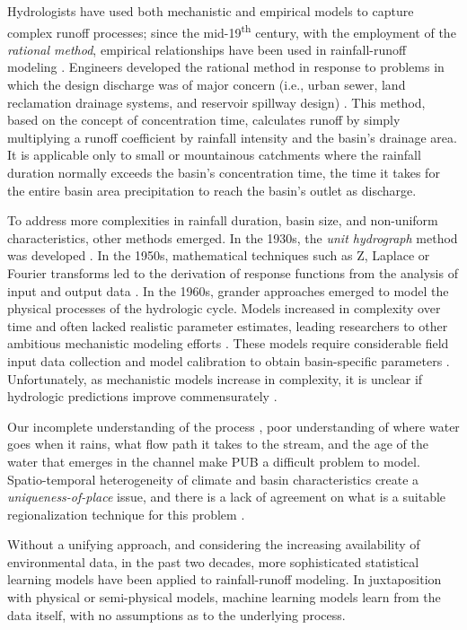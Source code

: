 Hydrologists have used both mechanistic and empirical models to capture complex runoff processes; since the mid-19\textsuperscript{th} century, with the employment of the \textit{rational method}, empirical relationships have been used in rainfall-runoff modeling \cite{beven2011rainfall}. Engineers developed the rational method in response to problems in which the design discharge was of major concern (i.e., urban sewer, land reclamation drainage systems, and reservoir spillway design) \cite{todini1988rainfall}. This method, based on the concept of concentration time, calculates runoff by simply multiplying a runoff coefficient by rainfall intensity and the basin's drainage area. It is applicable only to small or mountainous catchments where the rainfall duration normally exceeds the basin's concentration time, the time it takes for the entire basin area precipitation to reach the basin's outlet as discharge. 

To address more complexities in rainfall duration, basin size, and non-uniform characteristics, other methods emerged. In the 1930s, the \textit{unit hydrograph} method was developed \cite{sherman1932streamflow}. In the 1950s, mathematical techniques such as Z, Laplace or Fourier transforms led to the derivation of response functions from the analysis of input and output data \cite{dooge1973linear}. In the 1960s, grander approaches emerged to model the physical processes of the hydrologic cycle. Models increased in complexity over time and often lacked realistic parameter estimates, leading researchers to other ambitious mechanistic modeling efforts \cite{todini1988rainfall}. These models require considerable field input data collection and model calibration to obtain basin-specific parameters \cite{singh2005watershed}. Unfortunately, as mechanistic models increase in complexity, it is unclear if hydrologic predictions improve commensurately \cite{beven2011rainfall}. 

Our incomplete understanding of the process \cite{hrachowitz2013decade}, poor understanding of where water goes when it rains, what flow path it takes to the stream, and the age of the water that emerges in the channel \cite{sivapalan2003prediction} make PUB a difficult problem to model. Spatio-temporal heterogeneity of climate and basin characteristics create a \textit{uniqueness-of-place} issue, and there is a lack of agreement on what is a suitable regionalization technique for this problem  \cite{hrachowitz2013decade}. 

Without a unifying approach, and considering the increasing availability of environmental data, in the past two decades, more sophisticated statistical learning models have been applied to rainfall-runoff modeling. In juxtaposition with physical or semi-physical models, machine learning models learn from the data itself, with no assumptions as to the underlying process.

